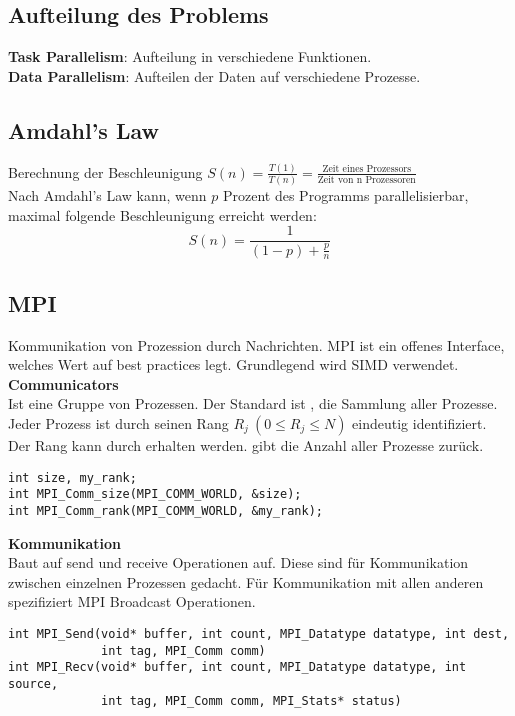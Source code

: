 \subsection{Aufteilung des Problems}%
\label{pp:sub:aufteilung-des-problems}
\textbf{Task Parallelism}: Aufteilung in verschiedene Funktionen.\\
\textbf{Data Parallelism}: Aufteilen der Daten auf verschiedene Prozesse.

\subsection{Amdahl's Law}%
\label{pp:sub:amdahls-law}
Berechnung der Beschleunigung \(S(n) = \frac{T(1)}{T(n)} = \frac{\text{Zeit eines Prozessors}}{\text{Zeit von n Prozessoren}}\)\\
Nach Amdahl's Law kann, wenn \(p\) Prozent des Programms parallelisierbar, maximal folgende Beschleunigung erreicht werden:
\[S(n) = \frac{1}{(1-p) + \frac{p}{n}}\]

\subsection{MPI}%
\label{pp:sub:mpi}
Kommunikation von Prozession durch Nachrichten. MPI ist ein offenes Interface, welches Wert auf best practices legt. Grundlegend wird SIMD verwendet.\\

\textbf{Communicators}\\
Ist eine Gruppe von Prozessen. Der Standard ist , die Sammlung aller Prozesse.\\
Jeder Prozess ist durch seinen Rang \(R_j\ (0 \leq R_j \leq N) \) eindeutig identifiziert. Der Rang kann durch  erhalten werden.
 gibt die Anzahl aller Prozesse zurück.
\begin{lstlisting}
int size, my_rank;
int MPI_Comm_size(MPI_COMM_WORLD, &size);
int MPI_Comm_rank(MPI_COMM_WORLD, &my_rank);
\end{lstlisting}

\textbf{Kommunikation}\\
Baut auf send und receive Operationen auf. Diese sind für Kommunikation zwischen einzelnen Prozessen gedacht.
Für Kommunikation mit allen anderen spezifiziert MPI Broadcast Operationen.
\begin{lstlisting}
int MPI_Send(void* buffer, int count, MPI_Datatype datatype, int dest,
             int tag, MPI_Comm comm)
int MPI_Recv(void* buffer, int count, MPI_Datatype datatype, int source,
             int tag, MPI_Comm comm, MPI_Stats* status)
\end{lstlisting}

